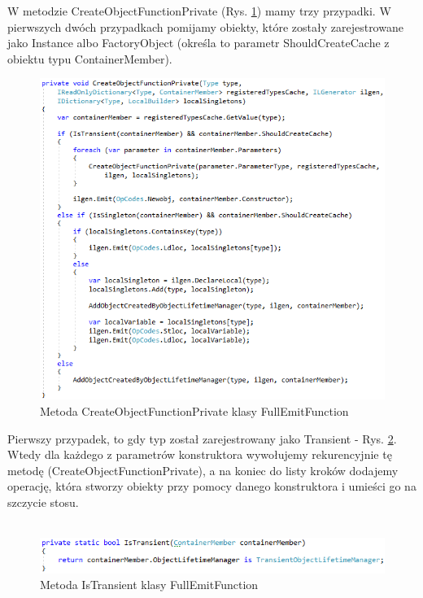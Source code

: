 \documentclass[12pt]{article}
\begin{document}
W metodzie CreateObjectFunctionPrivate (Rys. \ref{fig:FullEmitFunction_CreateObjectFunctionPrivate}) mamy trzy przypadki. W pierwszych dwóch przypadkach pomijamy obiekty, które zostały zarejestrowane jako Instance albo FactoryObject (określa to parametr ShouldCreateCache z obiektu typu ContainerMember).\\
\begin{figure}[H]
	\begin{center}
  		\includegraphics{FullEmitFunction_CreateObjectFunctionPrivate.png}
  		\caption{Metoda CreateObjectFunctionPrivate klasy FullEmitFunction}
  		\label{fig:FullEmitFunction_CreateObjectFunctionPrivate}
	\end{center}
\end{figure}

Pierwszy przypadek, to gdy typ został zarejestrowany jako Transient -  Rys. \ref{fig:FullEmitFunction_IsTransient}. Wtedy dla każdego z parametrów konstruktora wywołujemy rekurencyjnie tę metodę (CreateObjectFunctionPrivate), a na koniec do listy kroków dodajemy operację, która stworzy obiekty przy pomocy danego konstruktora i umieści go na szczycie stosu.\\ \\
\begin{figure}[H]
	\begin{center}
  		\includegraphics{FullEmitFunction_IsTransient.png}
  		\caption{Metoda IsTransient klasy FullEmitFunction}
  		\label{fig:FullEmitFunction_IsTransient}
	\end{center}
\end{figure}
\end{document}
